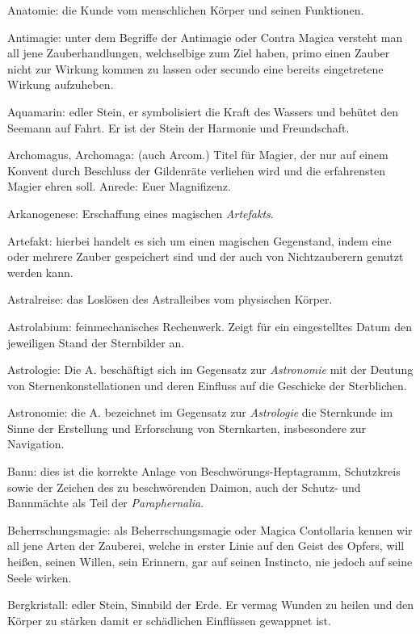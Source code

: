 \documentclass[a5paper,8pt]{book}
\begin{document}
\begin{small}
\begin{description}
 \item Anatomie: die Kunde vom menschlichen Körper und seinen Funktionen.
 \item Antimagie: unter dem Begriffe der Antimagie oder Contra Magica versteht man all jene Zauberhandlungen, welchselbige zum 
Ziel haben, primo einen Zauber nicht zur Wirkung kommen zu lassen oder secundo eine bereits eingetretene Wirkung 
aufzuheben.
 \item Aquamarin: edler Stein, er symbolisiert die Kraft des Wassers und behütet den Seemann auf Fahrt. Er ist der Stein der Harmonie und Freundschaft.
 \item Archomagus, Archomaga: (auch Arcom.) Titel für Magier, der nur auf einem Konvent durch Beschluss der Gildenräte verliehen wird und die erfahrensten Magier ehren soll. Anrede: Euer Magnifizenz.
 \item Arkanogenese: Erschaffung eines magischen \textit{Artefakts}.
 \item Artefakt: hierbei handelt es sich um einen magischen Gegenstand, indem eine oder mehrere Zauber gespeichert sind und der auch von Nichtzauberern genutzt werden kann.
 \item Astralreise: das Loslösen des Astralleibes vom physischen Körper. 
 \item Astrolabium: feinmechanisches Rechenwerk. Zeigt für ein eingestelltes Datum den jeweiligen Stand der Sternbilder an.
 \item Astrologie: Die A. beschäftigt sich im Gegensatz zur \textit{Astronomie} mit der Deutung von Sternenkonstellationen und 
deren Einfluss auf die Geschicke der Sterblichen.
 \item Astronomie: die A. bezeichnet im Gegensatz zur \textit{Astrologie} die Sternkunde im Sinne der Erstellung und Erforschung 
von Sternkarten, insbesondere zur Navigation.
 \item Bann: dies ist die korrekte Anlage von Beschwörungs-Heptagramm, Schutzkreis sowie der Zeichen des zu beschwörenden Daimon, 
auch der Schutz- und Bannmächte als Teil der \textit{Paraphernalia}.
 \item Beherrschungsmagie: als Beherrschungsmagie oder Magica Contollaria kennen wir all jene Arten der Zauberei, welche in erster 
Linie auf den Geist des Opfers, will heißen, seinen Willen, sein Erinnern, gar auf seinen Instincto, nie jedoch auf seine 
Seele wirken.
 \item Bergkristall: edler Stein, Sinnbild der Erde. Er vermag Wunden zu heilen und den Körper zu stärken damit er schädlichen 
Einflüssen gewappnet ist.

\end{description}
\end{small}
\end{document}
